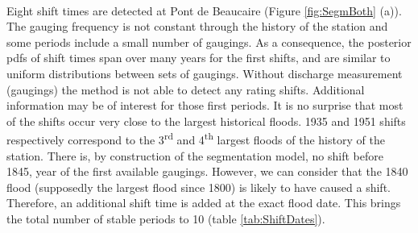     \paragraph{}
    Eight shift times are detected at Pont de Beaucaire (Figure \ref{fig:SegmBoth} (a)). The gauging frequency is not constant through the history of the station and some periods include a small number of gaugings. As a consequence, the posterior pdfs of shift times span over many years for the first shifts, and are similar to uniform distributions between sets of gaugings. Without discharge measurement (gaugings) the method is not able to detect any rating shifts. Additional information may be of interest for those first periods. It is no surprise that most of the shifts occur very close to the largest historical floods. 1935 and 1951 shifts respectively correspond to the 3\textsuperscript{rd} and 4\textsuperscript{th} largest floods of the history of the station. There is, by construction of the segmentation model, no shift before 1845, year of the first available gaugings. However, we can consider that the 1840 flood (supposedly the largest flood since 1800) is likely to have caused a shift. Therefore, an additional shift time is added at the exact flood date. This brings the total number of stable periods to 10 (table \ref{tab:ShiftDates}). 
    
